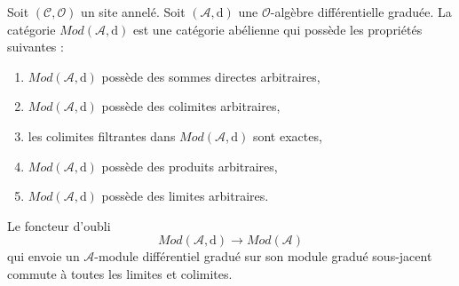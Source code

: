 \begin{lemma}
\label{lemma-dgm-abelian}
Soit $(\mathcal{C}, \mathcal{O})$ un site annelé.
Soit $(\mathcal{A}, \text{d})$ une $\mathcal{O}$-algèbre différentielle graduée.
La catégorie $\textit{Mod}(\mathcal{A}, \text{d})$ est une catégorie abélienne qui possède les propriétés suivantes :
\begin{enumerate}
\item $\textit{Mod}(\mathcal{A}, \text{d})$ possède des sommes directes arbitraires,
\item $\textit{Mod}(\mathcal{A}, \text{d})$ possède des colimites arbitraires,
\item les colimites filtrantes dans $\textit{Mod}(\mathcal{A}, \text{d})$ sont exactes,
\item $\textit{Mod}(\mathcal{A}, \text{d})$ possède des produits arbitraires,
\item $\textit{Mod}(\mathcal{A}, \text{d})$ possède des limites arbitraires.
\end{enumerate}
Le foncteur d'oubli
$$
\textit{Mod}(\mathcal{A}, \text{d})
\longrightarrow
\textit{Mod}(\mathcal{A})
$$
qui envoie un $\mathcal{A}$-module différentiel gradué sur son module gradué sous-jacent commute à toutes les limites et colimites.
\end{lemma}

